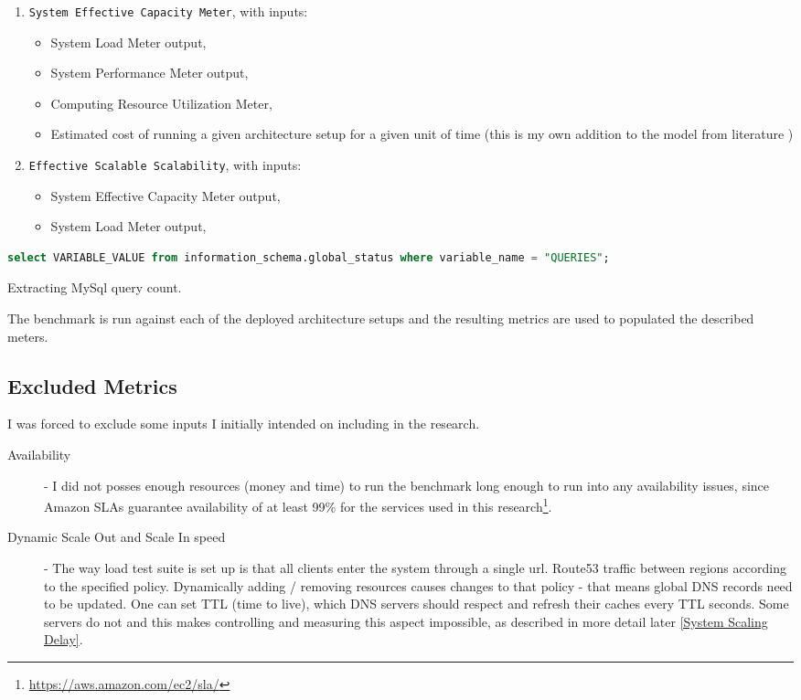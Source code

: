 \documentclass{uvamscse}
\begin{document}
\begin{enumerate}
  \item \texttt{System Effective Capacity Meter}, with inputs:
    \begin{itemize}
      \item System Load Meter output,
      \item System Performance Meter output,
      \item Computing Resource Utilization Meter,
      \item Estimated cost of running a given architecture setup for a given unit of time (this is my own addition to the model from literature \cite{Models})
    \end{itemize}
  \item \texttt{Effective Scalable Scalability}, with inputs:
    \begin{itemize}
      \item System Effective Capacity Meter output,
      \item System Load Meter output,
    \end{itemize}
\end{enumerate}

\begin{sourcecode}
\begin{lstlisting}[style=mono, language=SQL]
select VARIABLE_VALUE from information_schema.global_status where variable_name = "QUERIES";
\end{lstlisting}
\caption{Extracting MySql query count.}
\label{lstlisting:qcount}
\end{sourcecode}

The benchmark is run against each of the deployed architecture setups and the resulting metrics are used to populated the described meters.

\subsection{Excluded Metrics}\label{Excluded Metrics}

I was forced to exclude some inputs I initially intended on including in the research.

\begin{description}
  \item[Availability] - I did not posses enough resources (money and time) to run the benchmark long enough to run into any availability issues, since Amazon SLAs guarantee availability of at least 99\% for the services used in this research\footnote{\url{https://aws.amazon.com/ec2/sla/}}.
  \item[Dynamic Scale Out and Scale In speed] - The way load test suite is set up is that all clients enter the system through a single url. Route53 traffic between regions according to the specified policy. Dynamically adding / removing resources causes changes to that policy - that means global DNS records need to be updated. One can set TTL (time to live), which DNS servers should respect and refresh their caches every TTL seconds. Some servers do not and this makes controlling and measuring this aspect impossible, as described in more detail later \ref{System Scaling Delay}.
\end{description}
\end{document}
